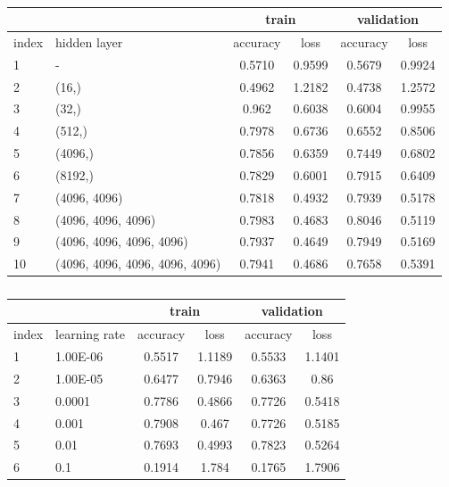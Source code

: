 \documentclass[12pt, a4paper]{article}
\begin{document}
\begin{latin}
\begin{table}[!ht]
    \centering
    \caption{}
    \begin{tabular}{|l|l|c|c|c|c|}
    \hline
        & & \multicolumn{2}{c|}{train} & \multicolumn{2}{c|}{validation}  \\ \hline
        index & hidden layer & accuracy & loss & accuracy & loss \\ \hline
        1 & - & 0.5710 & 0.9599 & 0.5679 & 0.9924 \\ \hline
        2 & (16,) & 0.4962 & 1.2182 & 0.4738 & 1.2572 \\ \hline
        3 & (32,) & 0.962 & 0.6038 & 0.6004 & 0.9955 \\ \hline
        4 & (512,) & 0.7978 & 0.6736 & 0.6552 & 0.8506 \\ \hline
        5 & (4096,) & 0.7856 & 0.6359 & 0.7449 & 0.6802 \\ \hline
        6 & (8192,) & 0.7829 & 0.6001 & 0.7915 & 0.6409 \\ \hline
        7 & (4096, 4096) & 0.7818 & 0.4932 & 0.7939 & 0.5178 \\ \hline
        8 & (4096, 4096, 4096) & 0.7983 & 0.4683 & 0.8046 & 0.5119 \\ \hline
        9 & (4096, 4096, 4096, 4096) & 0.7937 & 0.4649 & 0.7949 & 0.5169 \\ \hline
        10 & (4096, 4096, 4096, 4096, 4096) & 0.7941 & 0.4686 & 0.7658 & 0.5391 \\ \hline
    \end{tabular}
\end{table}
\end{latin}

\begin{latin}
\begin{table}[!ht]
    \centering
    \caption{}
    \begin{tabular}{|l|l|c|c|c|c|}
    \hline
        & & \multicolumn{2}{c|}{train} & \multicolumn{2}{c|}{validation}  \\ \hline
        index & learning rate & accuracy & loss & accuracy & loss \\ \hline
        1 & 1.00E-06 & 0.5517 & 1.1189 & 0.5533 & 1.1401 \\ \hline
        2 & 1.00E-05 & 0.6477 & 0.7946 & 0.6363 & 0.86 \\ \hline
        3 & 0.0001 & 0.7786 & 0.4866 & 0.7726 & 0.5418 \\ \hline
        4 & 0.001 & 0.7908 & 0.467 & 0.7726 & 0.5185 \\ \hline
        5 & 0.01 & 0.7693 & 0.4993 & 0.7823 & 0.5264 \\ \hline
        6 & 0.1 & 0.1914 & 1.784 & 0.1765 & 1.7906 \\ \hline
    \end{tabular}
\end{table}
\end{latin}
\end{document}
